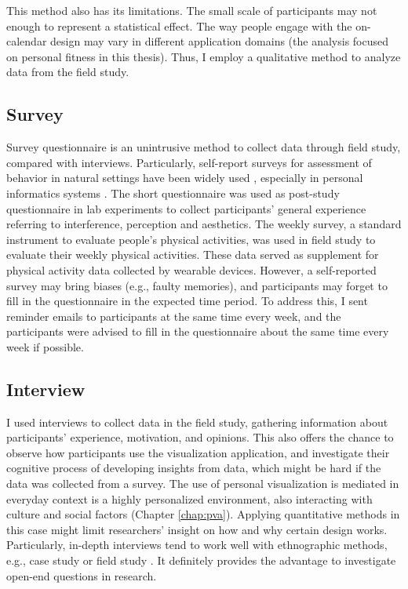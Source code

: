 \documentclass[12pt,oneside]{book}
\begin{document}
This method also has its limitations. The small scale of participants may not enough to represent a statistical effect.  The way people engage with the on-calendar design may vary in different application domains (the analysis focused on personal fitness in this thesis).  Thus, I employ a qualitative method to analyze data from the field study.

\subsection{Survey}
Survey questionnaire is an unintrusive method to collect data through field study, compared with interviews.  Particularly, self-report surveys for assessment of behavior in natural settings have been widely used \cite{intille_tools_2003}, especially in personal informatics systems \cite{li_stage-based_2010}.  The short questionnaire was used as post-study questionnaire in lab experiments to collect participants' general experience referring to interference, perception and aesthetics.  The weekly survey, a standard instrument to evaluate people's physical activities, was used in field study to evaluate their weekly physical activities.  These data served as supplement for physical activity data collected by wearable devices.  However, a self-reported survey may bring biases (e.g., faulty memories), and participants may forget to fill in the questionnaire in the expected time period.  To address this, I sent reminder emails to participants at the same time every week, and the participants were advised to fill in the questionnaire about the same time every week if possible.


\subsection{Interview}
I used interviews to collect data in the field study, gathering information about participants' experience, motivation, and opinions.  This also offers the chance to observe how participants use the visualization application, and investigate their cognitive process of developing insights from data, which might be hard if the data was collected from a survey.  The use of personal visualization is mediated in everyday context is a highly personalized environment, also interacting with culture and social factors (Chapter \ref{chap:pva}). Applying quantitative methods in this case might limit researchers' insight on how and why certain design works. Particularly, in-depth interviews tend to work well with ethnographic methods, e.g., case study or field study \cite{leedy_practical_2012}.  It definitely provides the advantage to investigate open-end questions in research.
\end{document}

